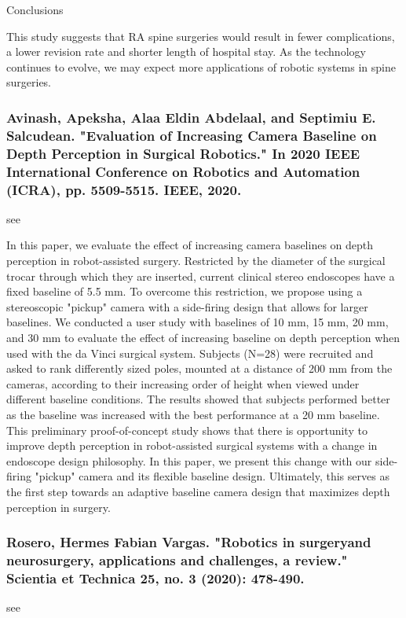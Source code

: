 \documentclass[conference]{IEEEtran}
\begin{document}
Conclusions

This study suggests that RA spine surgeries would result in fewer complications, a lower revision rate and shorter length of hospital stay. As the technology continues to evolve, we may expect more applications of robotic systems in spine surgeries.

\medskip
\subsubsection{Avinash, Apeksha, Alaa Eldin Abdelaal, and Septimiu E. Salcudean. "Evaluation of Increasing Camera Baseline on Depth Perception in Surgical Robotics." In 2020 IEEE International Conference on Robotics and Automation (ICRA), pp. 5509-5515. IEEE, 2020.}
see \cite{avinash2020evaluation}

In this paper, we evaluate the effect of increasing camera baselines on depth perception in robot-assisted surgery. Restricted by the diameter of the surgical trocar through which they are inserted, current clinical stereo endoscopes have a fixed baseline of 5.5 mm. To overcome this restriction, we propose using a stereoscopic "pickup" camera with a side-firing design that allows for larger baselines. We conducted a user study with baselines of 10 mm, 15 mm, 20 mm, and 30 mm to evaluate the effect of increasing baseline on depth perception when used with the da Vinci surgical system. Subjects (N=28) were recruited and asked to rank differently sized poles, mounted at a distance of 200 mm from the cameras, according to their increasing order of height when viewed under different baseline conditions. The results showed that subjects performed better as the baseline was increased with the best performance at a 20 mm baseline. This preliminary proof-of-concept study shows that there is opportunity to improve depth perception in robot-assisted surgical systems with a change in endoscope design philosophy. In this paper, we present this change with our side-firing "pickup" camera and its flexible baseline design. Ultimately, this serves as the first step towards an adaptive baseline camera design that maximizes depth perception in surgery.


\medskip
\subsubsection{Rosero, Hermes Fabian Vargas. "Robotics in surgeryand neurosurgery, applications and challenges, a review." Scientia et Technica 25, no. 3 (2020): 478-490.}
see \cite{rosero2020robotics}
\end{document}
